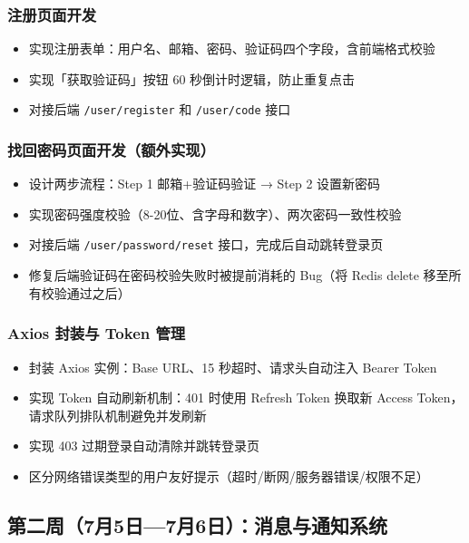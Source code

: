 \documentclass[12pt,a4paper]{ctexart}
\begin{document}
\subsubsection*{注册页面开发}
\begin{itemize}
    \item 实现注册表单：用户名、邮箱、密码、验证码四个字段，含前端格式校验
    \item 实现「获取验证码」按钮 60 秒倒计时逻辑，防止重复点击
    \item 对接后端 \texttt{/user/register} 和 \texttt{/user/code} 接口
\end{itemize}

\subsubsection*{找回密码页面开发（额外实现）}
\begin{itemize}
    \item 设计两步流程：Step 1 邮箱+验证码验证 → Step 2 设置新密码
    \item 实现密码强度校验（8-20位、含字母和数字）、两次密码一致性校验
    \item 对接后端 \texttt{/user/password/reset} 接口，完成后自动跳转登录页
    \item 修复后端验证码在密码校验失败时被提前消耗的 Bug（将 Redis delete 移至所有校验通过之后）
\end{itemize}

\subsubsection*{Axios 封装与 Token 管理}
\begin{itemize}
    \item 封装 Axios 实例：Base URL、15 秒超时、请求头自动注入 Bearer Token
    \item 实现 Token 自动刷新机制：401 时使用 Refresh Token 换取新 Access Token，请求队列排队机制避免并发刷新
    \item 实现 403 过期登录自动清除并跳转登录页
    \item 区分网络错误类型的用户友好提示（超时/断网/服务器错误/权限不足）
\end{itemize}

\subsection{第二周（7月5日—7月6日）：消息与通知系统}
\end{document}
